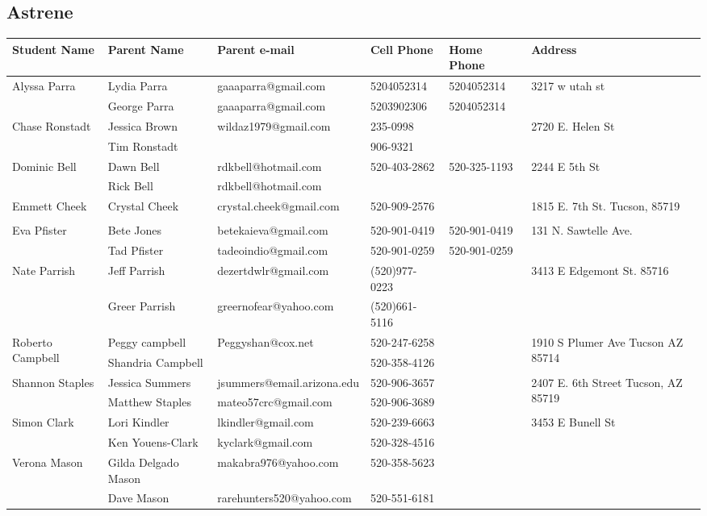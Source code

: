 \documentclass[landscape]{article}\usepackage[]{graphicx}\usepackage[]{color}
\begin{document}
\subsection{Astrene}
\begin{longtable}{|p{100pt}|p{100pt}|p{140pt}|p{60pt}|p{64pt}|p{120pt}|}
\textbf{Student Name} & \textbf{Parent Name} & \textbf{Parent e-mail} & \textbf{Cell Phone} & \textbf{Home Phone} & \textbf{Address}\\
\hline
\hline
\multirow{2}{100pt}{Alyssa Parra} & Lydia Parra & gaaaparra@gmail.com & 5204052314 & 5204052314 & \multirow{2}{120pt}{3217 w utah st} \\
 & George Parra & gaaaparra@gmail.com & 5203902306 & 5204052314 & \\
\hline
\multirow{2}{100pt}{Chase Ronstadt} & Jessica Brown & wildaz1979@gmail.com & 235-0998 &  & \multirow{2}{120pt}{2720 E. Helen St} \\
 & Tim Ronstadt &  & 906-9321 &  & \\
\hline
\multirow{2}{100pt}{Dominic Bell} & Dawn Bell & rdkbell@hotmail.com & 520-403-2862 & 520-325-1193 & \multirow{2}{120pt}{2244 E 5th St} \\
 & Rick Bell & rdkbell@hotmail.com &  &  & \\
\hline
\multirow{2}{100pt}{Emmett Cheek} & Crystal Cheek & crystal.cheek@gmail.com & 520-909-2576 &  & \multirow{2}{120pt}{1815 E. 7th St. Tucson, 85719} \\
 &  &  &  &  & \\
\hline
\multirow{2}{100pt}{Eva Pfister} & Bete Jones & betekaieva@gmail.com & 520-901-0419 & 520-901-0419 & \multirow{2}{120pt}{131 N. Sawtelle Ave.} \\
 & Tad Pfister & tadeoindio@gmail.com & 520-901-0259 & 520-901-0259 & \\
\hline
\multirow{2}{100pt}{Nate Parrish} & Jeff Parrish & dezertdwlr@gmail.com & (520)977-0223 &  & \multirow{2}{120pt}{3413 E Edgemont St. 85716} \\
 & Greer Parrish & greernofear@yahoo.com & (520)661-5116 &  & \\
\hline
\multirow{2}{100pt}{Roberto Campbell } & Peggy campbell & Peggyshan@cox.net & 520-247-6258 &  & \multirow{2}{120pt}{1910 S Plumer Ave Tucson AZ 85714} \\
 & Shandria Campbell  &  & 520-358-4126 &  & \\
\hline
\multirow{2}{100pt}{Shannon Staples} & Jessica Summers & jsummers@email.arizona.edu & 520-906-3657 &  & \multirow{2}{120pt}{2407 E. 6th Street Tucson, AZ  85719} \\
 & Matthew Staples & mateo57crc@gmail.com & 520-906-3689 &  & \\
\hline
\multirow{2}{100pt}{Simon Clark} & Lori Kindler & lkindler@gmail.com & 520-239-6663 &  & \multirow{2}{120pt}{3453 E Bunell St} \\
 & Ken Youens-Clark & kyclark@gmail.com & 520-328-4516 &  & \\
\hline
\multirow{2}{100pt}{Verona Mason} & Gilda Delgado Mason & makabra976@yahoo.com & 520-358-5623 &  & \multirow{2}{120pt}{} \\
 & Dave Mason & rarehunters520@yahoo.com & 520-551-6181 &  & \\
\hline
\end{longtable}
\newpage
\end{document}
